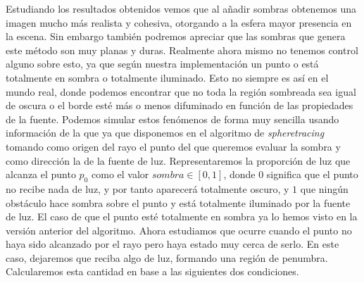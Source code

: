 Estudiando los resultados obtenidos vemos que al añadir sombras obtenemos una imagen mucho más realista y cohesiva, otorgando a la esfera mayor presencia en la escena. Sin embargo también podremos apreciar que las sombras que genera este método son muy planas y duras. Realmente ahora mismo no tenemos control alguno sobre esto, ya que según nuestra implementación un punto o está totalmente en sombra o totalmente iluminado. Esto no siempre es así en el mundo real, donde podemos encontrar que no toda la región sombreada sea igual de oscura o el borde esté más o menos difuminado en función de las propiedades de la fuente. Podemos simular estos fenómenos de forma muy sencilla usando información de la que ya que disponemos en el algoritmo de \textit{spheretracing} tomando como origen del rayo el punto del que queremos evaluar la sombra y como dirección la de la fuente de luz. Representaremos la proporción de luz que alcanza el punto $p_0$ como el valor $sombra \in [0,1]$, donde $0$ significa que el punto no recibe nada de luz, y por tanto aparecerá totalmente oscuro, y $1$ que ningún obstáculo hace sombra sobre el punto y está totalmente iluminado por la fuente de luz. El caso de que el punto esté totalmente en sombra ya lo hemos visto en la versión anterior del algoritmo. Ahora estudiamos que ocurre cuando el punto no haya sido alcanzado por el rayo pero haya estado muy cerca de serlo. En este caso, dejaremos que reciba algo de luz, formando una región de penumbra. Calcularemos esta cantidad en base a las siguientes dos condiciones.
